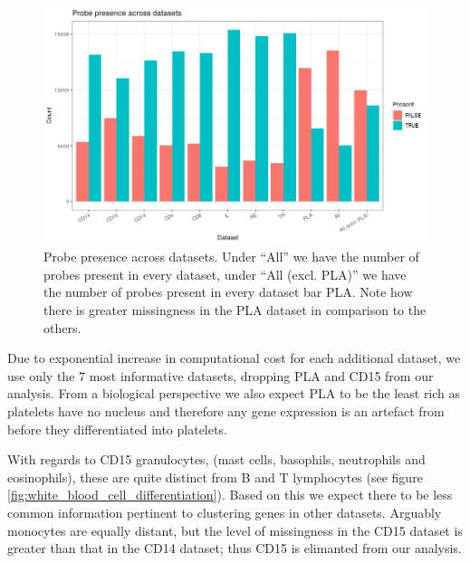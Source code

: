 \documentclass[12pt]{article} %
\begin{document}
	\begin{figure}
		\centering
		\includegraphics[scale=0.9 ]{Images/Data_inspection/probe_presence_across_datasets.png}
		\caption{Probe presence across datasets. Under ``All'' we have the number of probes present in every dataset, under ``All (excl. PLA)'' we have the number of probes present in every dataset bar PLA. Note how there is greater missingness in the PLA dataset in comparison to the others.}
		\label{fig:probe_presence_across_datasets}
	\end{figure}
	
	
	Due to exponential increase in computational cost for each additional dataset, we use only the 7 most informative datasets, dropping PLA and CD15 from our analysis. 
	From a biological perspective we also expect PLA to be the least rich as platelets have no nucleus \cite{Wrighthistogenesisbloodplatelets1910} and therefore any gene expression is an artefact from before they differentiated into platelets. 
	
	With regards to CD15 granulocytes, (mast cells, basophils, neutrophils and eosinophils), these are quite distinct from B and T lymphocytes (see figure \ref{fig:white_blood_cell_differentiation}). Based on this we expect there to be less common information pertinent to clustering genes in other datasets. Arguably monocytes are equally distant, but the level of missingness in the CD15 dataset is greater than that in the CD14 dataset; thus CD15 is elimanted from our analysis.
\end{document}
